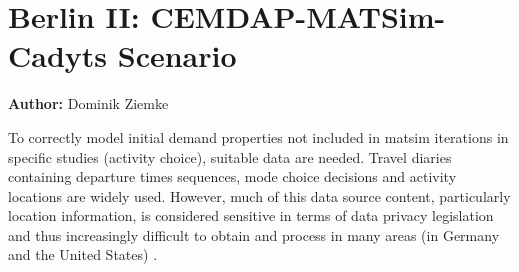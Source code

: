 \chapter{Berlin II: CEMDAP-MATSim-Cadyts Scenario}
\label{ch:berlinII}
\hfill \textbf{Author:} Dominik Ziemke


%
To correctly model initial demand properties not included in \gls{matsim} iterations in specific studies (\ie activity choice), suitable data are needed. Travel diaries containing departure times sequences, mode choice decisions and activity locations are widely used.
%
However, much of this data source content, particularly location information, is considered sensitive in terms of data privacy legislation and thus increasingly difficult to obtain and process in many areas (\eg in Germany and the United States) \citep{ZiemkeNagelBhatIntegratingCemdapMatsimTransferability}.

